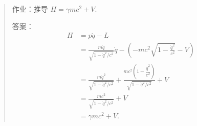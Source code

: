 \begin{quote}
作业：推导 \(H = \gamma mc^2 + V\).

答案：\begin{align*}
H & = p \dot{q} - L \\
& = \frac{m \dot{q}}{\sqrt{1 - \dot{q}^2 / c^2}} \dot{q} - \left( - mc^2 \sqrt{1 - \frac{\dot{q}^2}{c^2}} - V \right) \\
& = \frac{m \dot{q}^2}{\sqrt{1 - \dot{q}^2 / c^2}} + \frac{mc^2 \left( 1 - \dfrac{\dot{q}^2}{c^2} \right)}{\sqrt{1 - \dot{q}^2 / c^2}} + V \\
& = \frac{m c^2}{\sqrt{1 - \dot{q}^2 / c^2}} + V \\
& = \gamma mc^2 + V.
\end{align*}
\end{quote}
